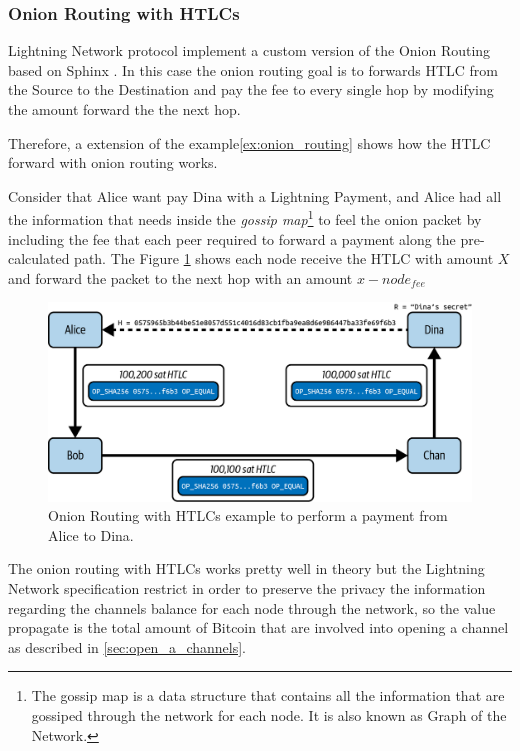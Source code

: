 \subsubsection{Onion Routing with HTLCs}

Lightning Network protocol implement a custom version of the Onion Routing based on Sphinx \cite{cryptoeprint:2008/475}. In this case the onion routing
goal is to forwards HTLC from the Source to the Destination and pay the fee to
every single hop by modifying the amount forward the the next hop.

Therefore, a extension of the example\ref{ex:onion_routing} shows how
the HTLC forward with onion routing works.

\begin{example}
  \label{ex:htl_onion_routing}
  Consider that Alice want pay Dina with a Lightning Payment, and Alice had all the
  information that needs inside the \emph{gossip map}\footnote{The gossip map is a data structure that contains all the information that are gossiped through the network for each node. It is also known as Graph of the Network.} to feel the
  onion packet by including the fee that each peer required to forward a payment
  along the pre-calculated path. The Figure \ref{fig:routing_path_htlc} shows each node receive the HTLC with
  amount $X$ and forward the packet to the next hop with an amount $x - node_{fee}$

  \begin{figure}[H]
    \begin{center}
      \includegraphics[width=0.6\columnwidth]{imgs/mtln_1008.png}
    \end{center}
    \caption{Onion Routing with HTLCs example to perform a payment from Alice to Dina.}
    \label{fig:routing_path_htlc}
  \end{figure}
\end{example}

The onion routing with HTLCs works pretty well in theory but the Lightning Network
specification restrict in order to preserve the privacy the information regarding
the channels balance for each node through the network, so the value
propagate is the total amount of Bitcoin that are involved into opening a channel as described in \ref{sec:open_a_channels}.

